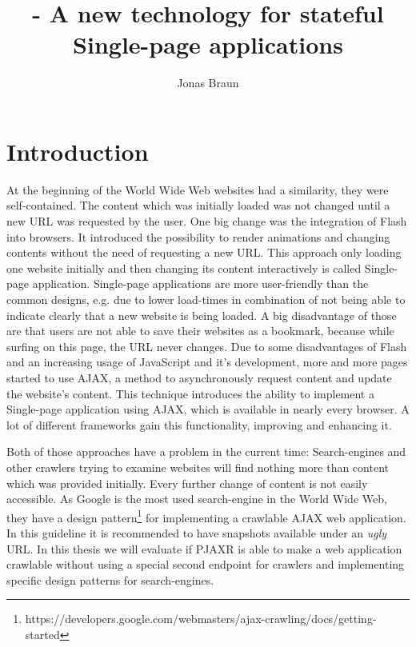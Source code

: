 \documentclass[f,bachelor,binding,twoside,palatino]{WeSTthesis}
\author{Jonas Braun}
\title{\pjaxr{} - A new technology for stateful Single-page applications}
\def \ajax {AJAX}
\def \pjaxr {PJAXR}
\begin{document}

\maketitle %

\tableofcontents

\varclearpage



\addtocounter{footnote}

\section{Introduction}
    At the beginning of the World Wide Web websites had a similarity, they were self-contained. The content which was initially loaded was not changed until a new URL was requested by the user.
    One big change was the integration of Flash into browsers. It introduced the possibility to render animations and changing contents without the need of requesting a new URL.
    This approach only loading one website initially and then changing its content interactively is called Single-page application.
    Single-page applications are more user-friendly than the common designs, e.g. due to lower load-times in combination of not being able to indicate clearly that a new website is being loaded.
    A big disadvantage of those are that users are not able to save their websites as a bookmark, because while surfing on this page, the URL never changes.
    Due to some disadvantages of Flash and an increasing usage of JavaScript and it's development, more and more pages started to use \ajax{}, a method to asynchronously request content and update the website's content. This technique introduces the ability to implement a Single-page application using \ajax{}, which is available in nearly every browser. A lot of different frameworks gain this functionality, improving and enhancing it.

    Both of those approaches have a problem in the current time: Search-engines and other crawlers trying to examine websites will find nothing more than content which was provided initially. Every further change of content is not easily accessible.
    As Google is the most used search-engine in the World Wide Web, they have a design pattern\footnote{https://developers.google.com/webmasters/ajax-crawling/docs/getting-started} for implementing a crawlable \ajax{} web application. In this guideline it is recommended to have snapshots available under an \emph{ugly} URL.
    In this thesis we will evaluate if \pjaxr{} is able to make a web application crawlable without using a special second endpoint for crawlers and implementing specific design patterns for search-engines.
\end{document}
